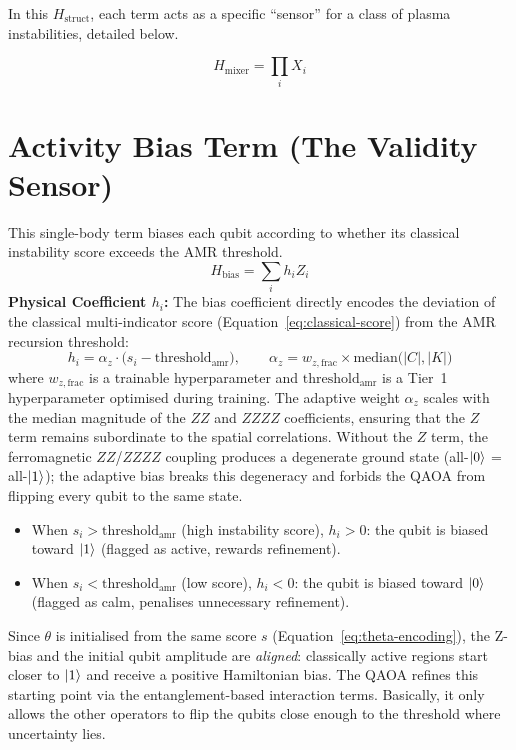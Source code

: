\documentclass[12pt, a4paper, oneside]{report}
\begin{document}
\noindent In this $H_{\text{struct}}$, each term acts as a specific ``sensor'' for a class of plasma instabilities, detailed below.

\begin{equation}
    H_{\text{mixer}} = \prod_i X_i
\end{equation}



\section{Activity Bias Term (The Validity Sensor)}
This single-body term biases each qubit according to whether its classical instability score exceeds the AMR threshold.
\begin{equation}
    H_{\text{bias}} = \sum_{i} h_i Z_i
\end{equation}
\textbf{Physical Coefficient $h_i$:} The bias coefficient directly encodes the deviation of the classical multi-indicator score (Equation~\ref{eq:classical-score}) from the AMR recursion threshold:
\begin{equation}
    h_i = \alpha_z \cdot \bigl(s_i - \text{threshold}_{\text{amr}}\bigr), \qquad \alpha_z = w_{z,\text{frac}} \times \text{median}\bigl(|C|, |K|\bigr)
\end{equation}
where $w_{z,\text{frac}}$ is a trainable hyperparameter and $\text{threshold}_{\text{amr}}$ is a Tier~1 hyperparameter optimised during training. The adaptive weight $\alpha_z$ scales with the median magnitude of the $ZZ$ and $ZZZZ$ coefficients, ensuring that the $Z$ term remains subordinate to the spatial correlations. Without the $Z$ term, the ferromagnetic $ZZ$/$ZZZZ$ coupling produces a degenerate ground state (all-$\ket{0}$ = all-$\ket{1}$); the adaptive bias breaks this degeneracy and forbids the QAOA from flipping every qubit to the same state.
\begin{itemize}
    \item When $s_i > \text{threshold}_{\text{amr}}$ (high instability score), $h_i > 0$: the qubit is biased toward $\ket{1}$ (flagged as active, rewards refinement).
    \item When $s_i < \text{threshold}_{\text{amr}}$ (low score), $h_i < 0$: the qubit is biased toward $\ket{0}$ (flagged as calm, penalises unnecessary refinement).
\end{itemize}
Since $\theta$ is initialised from the same score $s$ (Equation~\ref{eq:theta-encoding}), the Z-bias and the initial qubit amplitude are \textit{aligned}: classically active regions start closer to $\ket{1}$ and receive a positive Hamiltonian bias. The QAOA refines this starting point via the entanglement-based interaction terms. Basically, it only allows the other operators to flip the qubits close enough to the threshold where uncertainty lies.
\end{document}
